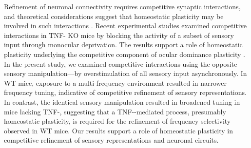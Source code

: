 Refinement of neuronal connectivity requires competitive synaptic interactions, and theoretical considerations suggest that homeostatic plasticity may be involved in such interactions \cite{Davis2001, Burrone2003, Turrigiano2004}. Recent experimental studies examined competitive interactions in TNF-\textalpha{} KO mice by blocking the activity of a subset of sensory input through monocular deprivation. The results support a role of homeostatic plasticity underlying the competitive component of ocular dominance plasticity \cite{Kaneko2008, Ranson2012}. In the present study, we examined competitive interactions using the opposite sensory manipulation---by overstimulation of all sensory input asynchronously. In WT mice, exposure to a multi-frequency environment resulted in narrower frequency tuning, indicative of competitive refinement of sensory representations. In contrast, the identical sensory manipulation resulted in broadened tuning in mice lacking TNF-\textalpha{}, suggesting that a TNF-\textalpha{}-mediated process, presumably homeostatic plasticity, is required for the refinement of frequency selectivity observed in WT mice. Our results support a role of homeostatic plasticity in competitive refinement of sensory representations and neuronal circuits.

